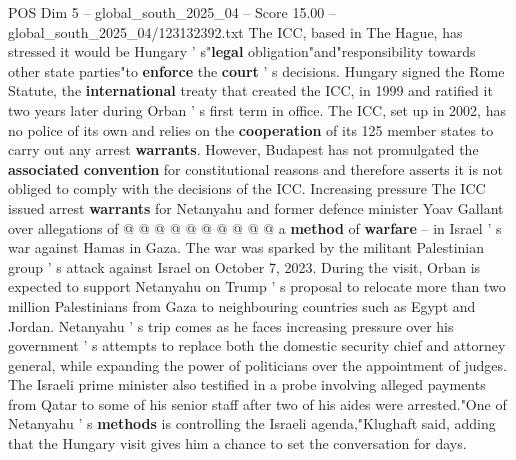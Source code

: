 \begin{textsample}{POS Dim 5 – global\_south\_2025\_04 – Score 15.00 – global\_south\_2025\_04/123132392.txt}
The ICC, based in The Hague, has stressed it would be Hungary ' s"\textbf{legal} obligation"and"responsibility towards other state parties"to \textbf{enforce} the \textbf{court} ' s decisions.
Hungary signed the Rome Statute, the \textbf{international} treaty that created the ICC, in 1999 and ratified it two years later during Orban ' s first term in office.
The ICC, set up in 2002, has no police of its own and relies on the \textbf{cooperation} of its 125 member states to carry out any arrest \textbf{warrants}.
However, Budapest has not promulgated the \textbf{associated} \textbf{convention} for constitutional reasons and therefore asserts it is not obliged to comply with the decisions of the ICC.
Increasing pressure The ICC issued arrest \textbf{warrants} for Netanyahu and former defence minister Yoav Gallant over allegations of @ @ @ @ @ @ @ @ @ @ a \textbf{method} of \textbf{warfare} -- in Israel ' s war against Hamas in Gaza.
The war was sparked by the militant Palestinian group ' s attack against Israel on October 7, 2023.
During the visit, Orban is expected to support Netanyahu on Trump ' s proposal to relocate more than two million Palestinians from Gaza to neighbouring countries such as Egypt and Jordan.
Netanyahu ' s trip comes as he faces increasing pressure over his government ' s attempts to replace both the domestic security chief and attorney general, while expanding the power of politicians over the appointment of judges.
The Israeli prime minister also testified in a probe involving alleged payments from Qatar to some of his senior staff after two of his aides were arrested."One of Netanyahu ' s \textbf{methods} is controlling the Israeli agenda,"Klughaft said, adding that the Hungary visit gives him a chance to set the conversation for days.

\end{textsample}
